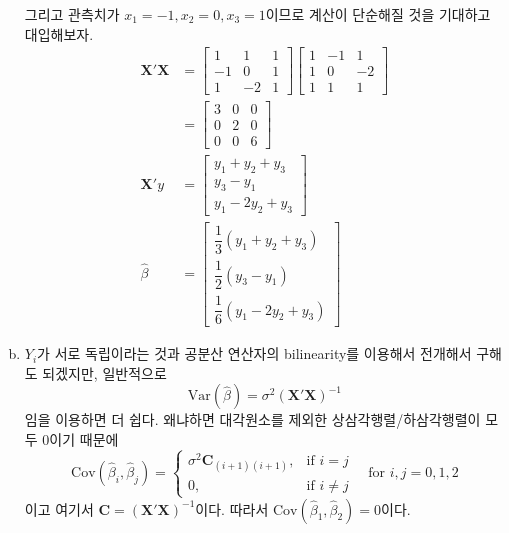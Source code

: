 \documentclass[answers]{exam}
\begin{document}
\begin{questions}
\begin{solution}
\begin{enumerate}[(a)]
\begin{equation}
        \end{equation}
        그리고 관측치가 $x_{1}=-1, x_{2}=0,x_{3}=1$이므로 계산이 단순해질 것을 기대하고 대입해보자.
        \begin{align}
          \mathbf{X}'\mathbf{X} &= \begin{bmatrix}1 & 1 &1\\ -1 & 0 & 1\\ 1 & -2 & 1 \end{bmatrix}\begin{bmatrix}1 & -1 & 1\\ 1 & 0 & -2 \\ 1 & 1 & 1 \end{bmatrix}\\
          &= \begin{bmatrix}3 & 0  & 0 \\ 0 & 2 & 0\\ 0 & 0 & 6 \end{bmatrix}\\
          \mathbf{X}'y &= \begin{bmatrix}y_{1}+y_{2}+y_{3}\\ y_{3}-y_{1}\\ y_{1}-2y_{2}+y_{3} \end{bmatrix}\\
          \widehat{\beta} &= \begin{bmatrix}\dfrac{1}{3}\left(y_{1}+y_{2}+y_{3}\right)\\\dfrac{1}{2}\left(y_{3}-y_{1}\right)\\\dfrac{1}{6}\left(y_{1}-2y_{2}+y_{3}\right) \end{bmatrix}
        \end{align}
        \item $Y_{i}$가 서로 독립이라는 것과 공분산 연산자의 bilinearity를 이용해서 전개해서 구해도 되겠지만, 일반적으로
        \begin{equation}
          \mathrm{Var}\left(\widehat{\beta}\right) = \sigma^{2}\left(\mathbf{X}'\mathbf{X}\right)^{-1}
        \end{equation}
        임을 이용하면 더 쉽다. 왜냐하면 대각원소를 제외한 상삼각행렬/하삼각행렬이 모두 0이기 때문에
        \begin{equation}
          \mathrm{Cov}\left(\widehat{\beta}_{i},\widehat{\beta}_{j}\right) =\begin{cases}\sigma^{2}\mathbf{C}_{(i+1)(i+1)}, & \text{if $i=j$}\\ 0, & \text{if $i\neq j$} \end{cases} \quad \text{for $i,j=0,1,2$}
        \end{equation}
        이고 여기서 $\mathbf{C}=\left(\mathbf{X}'\mathbf{X}\right)^{-1}$이다. 따라서 $\mathrm{Cov}\left(\widehat{\beta}_{1},\widehat{\beta}_{2}\right)=0$이다.
      \end{enumerate}
    \end{solution}
\end{questions}
\end{document}
